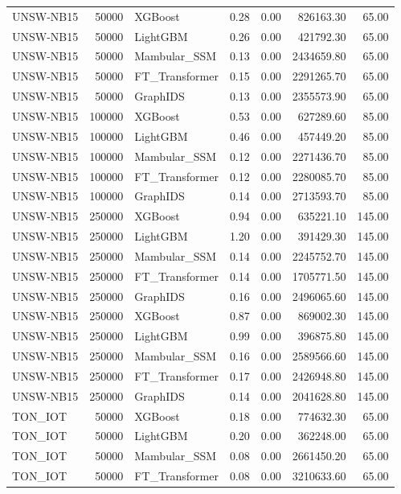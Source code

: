 \begin{table}[t]
\begin{tabular}{lrlrrrr}
UNSW-NB15 & 50000 & XGBoost & 0.28 & 0.00 & 826163.30 & 65.00 \\
UNSW-NB15 & 50000 & LightGBM & 0.26 & 0.00 & 421792.30 & 65.00 \\
UNSW-NB15 & 50000 & Mambular_SSM & 0.13 & 0.00 & 2434659.80 & 65.00 \\
UNSW-NB15 & 50000 & FT_Transformer & 0.15 & 0.00 & 2291265.70 & 65.00 \\
UNSW-NB15 & 50000 & GraphIDS & 0.13 & 0.00 & 2355573.90 & 65.00 \\
UNSW-NB15 & 100000 & XGBoost & 0.53 & 0.00 & 627289.60 & 85.00 \\
UNSW-NB15 & 100000 & LightGBM & 0.46 & 0.00 & 457449.20 & 85.00 \\
UNSW-NB15 & 100000 & Mambular_SSM & 0.12 & 0.00 & 2271436.70 & 85.00 \\
UNSW-NB15 & 100000 & FT_Transformer & 0.12 & 0.00 & 2280085.70 & 85.00 \\
UNSW-NB15 & 100000 & GraphIDS & 0.14 & 0.00 & 2713593.70 & 85.00 \\
UNSW-NB15 & 250000 & XGBoost & 0.94 & 0.00 & 635221.10 & 145.00 \\
UNSW-NB15 & 250000 & LightGBM & 1.20 & 0.00 & 391429.30 & 145.00 \\
UNSW-NB15 & 250000 & Mambular_SSM & 0.14 & 0.00 & 2245752.70 & 145.00 \\
UNSW-NB15 & 250000 & FT_Transformer & 0.14 & 0.00 & 1705771.50 & 145.00 \\
UNSW-NB15 & 250000 & GraphIDS & 0.16 & 0.00 & 2496065.60 & 145.00 \\
UNSW-NB15 & 250000 & XGBoost & 0.87 & 0.00 & 869002.30 & 145.00 \\
UNSW-NB15 & 250000 & LightGBM & 0.99 & 0.00 & 396875.80 & 145.00 \\
UNSW-NB15 & 250000 & Mambular_SSM & 0.16 & 0.00 & 2589566.60 & 145.00 \\
UNSW-NB15 & 250000 & FT_Transformer & 0.17 & 0.00 & 2426948.80 & 145.00 \\
UNSW-NB15 & 250000 & GraphIDS & 0.14 & 0.00 & 2041628.80 & 145.00 \\
TON_IOT & 50000 & XGBoost & 0.18 & 0.00 & 774632.30 & 65.00 \\
TON_IOT & 50000 & LightGBM & 0.20 & 0.00 & 362248.00 & 65.00 \\
TON_IOT & 50000 & Mambular_SSM & 0.08 & 0.00 & 2661450.20 & 65.00 \\
TON_IOT & 50000 & FT_Transformer & 0.08 & 0.00 & 3210633.60 & 65.00 \\

\end{tabular}
\end{table}
